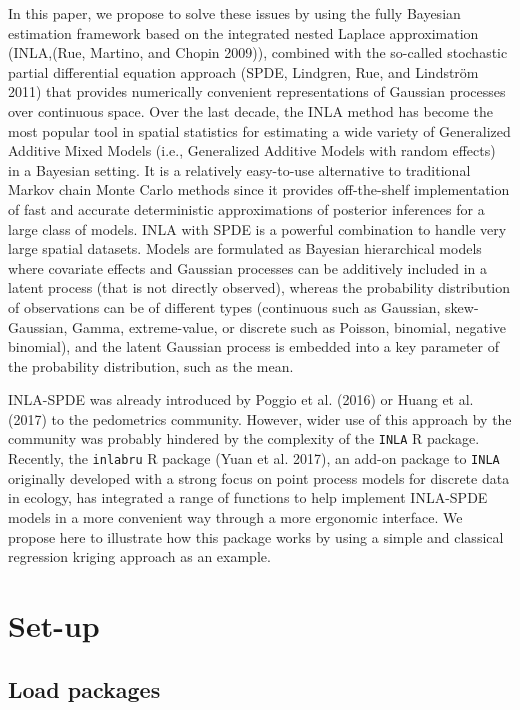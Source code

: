 \documentclass[
  a4paper,
]{article}
\begin{document}
In this paper, we propose to solve these issues by using the fully
Bayesian estimation framework based on the integrated nested Laplace
approximation (INLA,(Rue, Martino, and Chopin 2009)), combined with the
so-called stochastic partial differential equation approach (SPDE,
Lindgren, Rue, and Lindström 2011) that provides numerically convenient
representations of Gaussian processes over continuous space. Over the
last decade, the INLA method has become the most popular tool in spatial
statistics for estimating a wide variety of Generalized Additive Mixed
Models (i.e., Generalized Additive Models with random effects) in a
Bayesian setting. It is a relatively easy-to-use alternative to
traditional Markov chain Monte Carlo methods since it provides
off-the-shelf implementation of fast and accurate deterministic
approximations of posterior inferences for a large class of models. INLA
with SPDE is a powerful combination to handle very large spatial
datasets. Models are formulated as Bayesian hierarchical models where
covariate effects and Gaussian processes can be additively included in a
latent process (that is not directly observed), whereas the probability
distribution of observations can be of different types (continuous such
as Gaussian, skew-Gaussian, Gamma, extreme-value, or discrete such as
Poisson, binomial, negative binomial), and the latent Gaussian process
is embedded into a key parameter of the probability distribution, such
as the mean.

INLA-SPDE was already introduced by Poggio et al. (2016) or Huang et al.
(2017) to the pedometrics community. However, wider use of this approach
by the community was probably hindered by the complexity of the
\texttt{INLA} R package. Recently, the \texttt{inlabru} R package (Yuan
et al. 2017), an add-on package to \texttt{INLA} originally developed
with a strong focus on point process models for discrete data in
ecology, has integrated a range of functions to help implement INLA-SPDE
models in a more convenient way through a more ergonomic interface. We
propose here to illustrate how this package works by using a simple and
classical regression kriging approach as an example.

\hypertarget{set-up}{%
\section{Set-up}\label{set-up}}

\hypertarget{load-packages}{%
\subsection{Load packages}\label{load-packages}}
\end{document}
